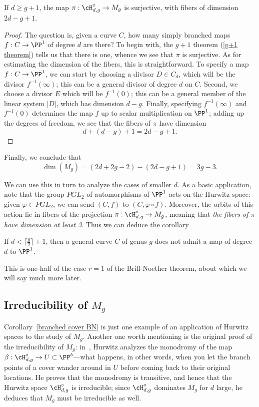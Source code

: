 \begin{proposition}
If $d \geq g+1$, the map $\pi : \cH^\circ_{d,g} \to M_g$ is surjective, with fibers of dimension $2d-g+1$.
\end{proposition}

\begin{proof}
The question is, given a curve $C$, how many simply branched maps $f : C \to \PP^1$ of degree $d$ are there? To begin with, the $g+1$ theorem (\ref{g+1 theorem}) tells us that there is one, whence we see that $\pi$ is surjective. As for estimating the dimension of the fibers, this is straightforward. To specify a map $f : C \to \PP^1$, we can start by choosing a divisor $D \in C_d$, which will be the divisor $f^{-1}(\infty)$; this can be a general divisor of degree $d$ on $C$. Second, we choose a divisor $E$ which will be $f^{-1}(0)$; this can be a general member of the linear system $|D|$, which has dimension $d-g$. Finally, specifying $f^{-1}(\infty)$ and $f^{-1}(0)$ determines the map $f$ up to scalar multiplication on $\PP^1$; adding up the degrees of freedom, we see that the fibers of $\pi$ have dimension
$$
d + (d-g) + 1 = 2d-g+1.
$$ 
\end{proof}

Finally, we conclude that
$$
\dim(M_g) = (2d+2g-2) - (2d - g + 1) = 3g-3.
$$

We can use this in turn to analyze the cases of smaller $d$. As a basic application, note that the group $PGL_2$ of automorphisms of $\PP^1$ acts on the Hurwitz space: given $\varphi \in PGL_2$, we can send $(C,f)$ to $(C, \varphi \circ f)$. Moreover, the orbits of this action lie in fibers of the projection $\pi : \cH^\circ_{d,g} \to M_g$, meaning that \emph{the fibers of $\pi$ have dimension at least 3}. Thus we can deduce the corollary

\begin{corollary}\label{branched cover BN}
If $d < \lceil \frac{g}{2} \rceil + 1$, then a general curve $C$ of genus $g$ does not admit a map of degree $d$ to $\PP^1$.
\end{corollary}

This is one-half of the case $r=1$ of the Brill-Noether theorem, about which we will say much more later.

\subsection{Irreducibility of $M_g$}

Corollary~\ref{branched cover BN}  is just one example of an application of Hurwitz spaces to the study of $M_g$. Another one worth mentioning is the original proof of the irreducibility of $M_g$: in~\cite{Hurwitz}, Hurwitz analyzes the monodromy of the map $\beta: \cH^\circ_{d,g} \to U \subset \PP^b$---what happens, in other words, when you let the branch points of a cover wander around in $U$ before coming back to their original locations. He proves that the monodromy is transitive, and hence that the Hurwitz space $\cH^\circ_{d,g}$ is irreducible; since $\cH^\circ_{d,g}$ dominates $M_g$ for $d$ large, he deduces that $M_g$ must be irreducible as well.

